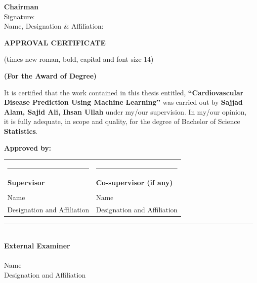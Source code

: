 \documentclass[12pt, a4paper, oneside]{book}
\newcommand{\thesistitle}{Cardiovascular Disease Prediction Using Machine Learning}
\newcommand{\thesisauthorA}{Sajjad Alam}
\newcommand{\thesisauthorB}{Sajid Ali}
\newcommand{\thesisauthorC}{Ihsan Ullah}
\begin{document}
\vspace{0.6in}
\noindent \textbf{Chairman}\\
Signature: \hrulefill\\
Name, Designation \& Affiliation: \hrulefill

\clearpage
\thispagestyle{plain}
\vspace*{0.5cm}
\begin{center}
{\fontsize{14pt}{16pt}\selectfont \textbf{APPROVAL CERTIFICATE}\par}
\vspace{0.05in}
{\fontsize{11pt}{13pt}\selectfont (times new roman, bold, capital and font size 14)\par}
\vspace{0.2in}
{\fontsize{14pt}{16pt}\selectfont \textbf{(For the Award of Degree)}\par}
\end{center}
\vspace{0.4in}

\noindent It is certified that the work contained in this thesis entitled, \textbf{``\thesistitle''} was carried out by \textbf{\thesisauthorA, \thesisauthorB, \thesisauthorC} under my/our supervision. In my/our opinion, it is fully adequate, in scope and quality, for the degree of Bachelor of Science \textbf{Statistics}.

\vspace{0.6in}

\noindent \textbf{Approved by:}

\vspace{0.5in}

\noindent
\begin{tabular}{@{}p{}p{}@{}}
\rule{2.2in}{0.4pt} & \rule{2.2in}{0.4pt} \\
\textbf{Supervisor} & \textbf{Co-supervisor (if any)} \\
& \\
Name & Name \\
Designation and Affiliation & Designation and Affiliation
\end{tabular}

\vspace{0.6in}

\noindent \rule{2.2in}{0.4pt}\\
\textbf{External Examiner}\\
\\
Name\\
Designation and Affiliation
\end{document}
